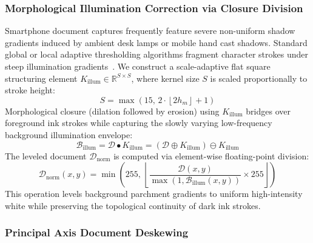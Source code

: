 \documentclass{IEEEtran}
\begin{document}
\subsubsection{Morphological Illumination Correction via Closure Division}

Smartphone document captures frequently feature severe non-uniform shadow gradients induced by ambient desk lamps or mobile hand cast shadows. Standard global or local adaptive thresholding algorithms fragment character strokes under steep illumination gradients~\cite{chen2019}. We construct a scale-adaptive flat square structuring element $K_{\text{illum}} \in \mathbb{R}^{S \times S}$, where kernel size $S$ is scaled proportionally to stroke height:
\begin{equation}
S = \max\left(15, \, 2 \cdot \left\lfloor 2 h_m \right\rfloor + 1\right)
\label{eq:kernel_illum}
\end{equation}
\noindent Morphological closure (dilation followed by erosion) using $K_{\text{illum}}$ bridges over foreground ink strokes while capturing the slowly varying low-frequency background illumination envelope:
\begin{equation}
\mathcal{B}_{\text{illum}} = \mathcal{D} \bullet K_{\text{illum}} = \left(\mathcal{D} \oplus K_{\text{illum}}\right) \ominus K_{\text{illum}}
\end{equation}
\noindent The leveled document $\mathcal{D}_{\text{norm}}$ is computed via element-wise floating-point division:
\begin{equation}
\mathcal{D}_{\text{norm}}(x, y) = \min\left(255, \, \left\lfloor \frac{\mathcal{D}(x, y)}{\max(1, \mathcal{B}_{\text{illum}}(x, y))} \times 255 \right\rfloor \right)
\label{eq:closure_division}
\end{equation}
\noindent This operation levels background parchment gradients to uniform high-intensity white while preserving the topological continuity of dark ink strokes.

\subsubsection{Principal Axis Document Deskewing}
\end{document}
